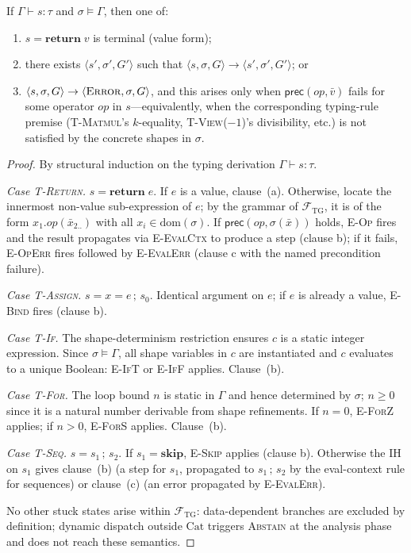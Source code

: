 \begin{theorem}[Progress]\label{thm:progress}
If $\Gamma\vdash s:\tau$ and $\sigma\models\Gamma$, then one of:
\begin{enumerate}
  \item $s=\mathbf{return}\;v$ is terminal (value form);
  \item there exists $\langle s',\sigma',G'\rangle$ such that
        $\langle s,\sigma,G\rangle\to\langle s',\sigma',G'\rangle$; or
  \item $\langle s,\sigma,G\rangle\to\langle\textsc{Error},\sigma,G\rangle$,
        and this arises only when $\mathsf{prec}(\mathit{op},\bar v)$
        fails for some operator $\mathit{op}$ in $s$---equivalently,
        when the corresponding typing-rule premise
        (\textsc{T-Matmul}'s $k$-equality,
        \textsc{T-View($-1$)}'s divisibility, etc.)
        is not satisfied by the concrete shapes in $\sigma$.
\end{enumerate}
\end{theorem}
\begin{proof}
By structural induction on the typing derivation $\Gamma\vdash s:\tau$.

\emph{Case \textsc{T-Return}.}
$s=\mathbf{return}\;e$.
If $e$ is a value, clause~(a).
Otherwise, locate the innermost non-value sub-expression of $e$;
by the grammar of $\mathcal{F}_{\mathrm{TG}}$, it is of the form
$x_1.\mathit{op}(\bar x_{2..})$ with all $x_i\in\mathrm{dom}(\sigma)$.
If $\mathsf{prec}(\mathit{op},\sigma(\bar x))$ holds, \textsc{E-Op} fires and
the result propagates via \textsc{E-EvalCtx} to produce a step (clause b);
if it fails, \textsc{E-OpErr} fires followed by \textsc{E-EvalErr}
(clause c with the named precondition failure).

\emph{Case \textsc{T-Assign}.}
$s=x=e\,;\,s_0$.
Identical argument on $e$; if $e$ is already a value,
\textsc{E-Bind} fires (clause b).

\emph{Case \textsc{T-If}.}
The shape-determinism restriction ensures $c$ is a static integer expression.
Since $\sigma\models\Gamma$, all shape variables in $c$ are instantiated
and $c$ evaluates to a unique Boolean: \textsc{E-IfT} or \textsc{E-IfF}
applies.  Clause~(b).

\emph{Case \textsc{T-For}.}
The loop bound $n$ is static in $\Gamma$ and hence determined by $\sigma$;
$n\geq 0$ since it is a natural number derivable from shape refinements.
If $n=0$, \textsc{E-ForZ} applies; if $n>0$, \textsc{E-ForS} applies.
Clause~(b).

\emph{Case \textsc{T-Seq}.}
$s=s_1\,;\,s_2$.
If $s_1=\mathbf{skip}$, \textsc{E-Skip} applies (clause b).
Otherwise the IH on $s_1$ gives clause~(b) (a step for $s_1$,
propagated to $s_1\,;\,s_2$ by the eval-context rule for sequences)
or clause~(c) (an error propagated by \textsc{E-EvalErr}).

\smallskip\noindent
No other stuck states arise within $\mathcal{F}_{\mathrm{TG}}$:
data-dependent branches are excluded by definition;
dynamic dispatch outside $\mathrm{Cat}$ triggers \textsc{Abstain} at the
analysis phase and does not reach these semantics.
\end{proof}

